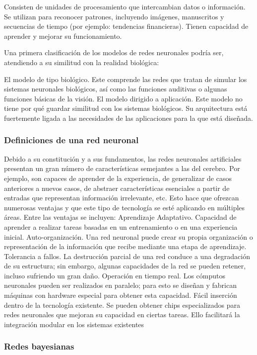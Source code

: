 Consisten de unidades de procesamiento que intercambian datos o información. 
Se utilizan para reconocer patrones, incluyendo imágenes, manuscritos y secuencias de tiempo (por ejemplo: tendencias financieras).
Tienen capacidad de aprender y mejorar su funcionamiento.

Una primera clasificación de los modelos de redes neuronales podría ser,
atendiendo a su similitud con la realidad biológica:

El modelo de tipo biológico. Este comprende las redes que tratan de simular los sistemas neuronales biológicos, así como las funciones auditivas o algunas funciones básicas de la visión.
El modelo dirigido a aplicación. Este modelo no tiene por qué guardar similitud con los sistemas biológicos. Su arquitectura está fuertemente ligada a las necesidades de las aplicaciones para la que está diseñada.


\subsubsection{Definiciones de una red neuronal}


Debido a su constitución y a sus fundamentos, las redes neuronales artificiales presentan un gran número de características semejantes a las del cerebro. Por ejemplo, son capaces de aprender de la experiencia, de generalizar de casos anteriores a nuevos casos, de abstraer características esenciales a partir de entradas que representan información irrelevante, etc. Esto hace que ofrezcan numerosas ventajas y que este tipo de tecnología se esté aplicando en múltiples áreas. Entre las ventajas se incluyen: 
Aprendizaje Adaptativo. Capacidad de aprender a realizar tareas basadas en un entrenamiento o en una experiencia inicial. 
Auto-organización. Una red neuronal puede crear su propia organización o representación de la información que recibe mediante una etapa de aprendizaje.
Tolerancia a fallos. La destrucción parcial de una red conduce a una degradación de su estructura; sin embargo, algunas capacidades de la red se pueden retener, incluso sufriendo un gran daño.
Operación en tiempo real. Los cómputos neuronales pueden ser realizados en paralelo; para esto se diseñan y fabrican máquinas con hardware especial para obtener esta capacidad.
Fácil inserción dentro de la tecnología existente. Se pueden obtener chips especializados para redes neuronales que mejoran su capacidad en ciertas tareas. Ello facilitará la integración modular en los sistemas existentes

\subsubsection{Redes bayesianas}

